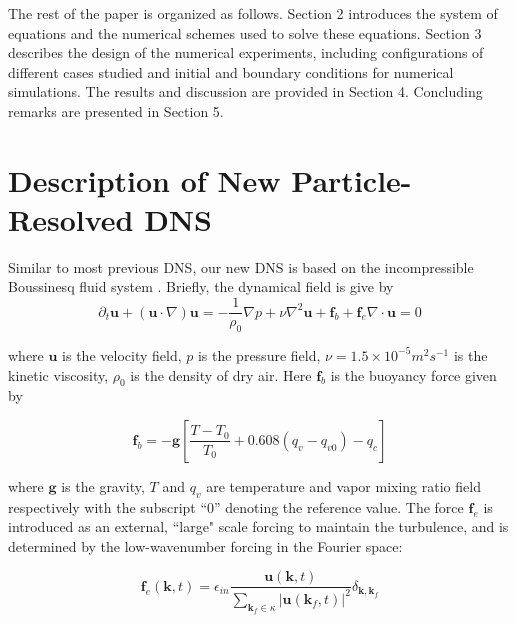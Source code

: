 The rest of the paper is organized as follows. Section 2 introduces the system of equations and the numerical schemes used to solve these equations. Section 3 describes the design of the numerical experiments, including configurations of different cases studied and initial and boundary conditions for numerical simulations. The results and discussion are provided in Section 4. Concluding remarks are presented in Section 5. 

\section{Description of New Particle-Resolved DNS}\label{particle_dns}

Similar to most previous DNS, our new DNS is based on the incompressible
Boussinesq fluid system \cite{And04}. Briefly, the dynamical field is give by
\begin{subequations}

\begin{equation}
\partial_{t}\mathbf{u}+(\mathbf{u}\cdot\nabla)\mathbf{u}=-\frac{1}{\rho_{0}}\nabla p+\nu\nabla^2 \mathbf{u}+\mathbf{f}_b + \mathbf{f}_e\label{eq:NS1}
\end{equation}


\begin{equation}
\nabla\cdot \mathbf{u}=0\label{eq:NS2}
\end{equation}

\end{subequations}

where $\mathbf{u}$ is the velocity field, $p$ is the pressure field, $\nu = 1.5\times 10^{-5}m^2s^{-1}$ is the kinetic viscosity, $\rho_{0}$ is the density of dry air. Here $\mathbf{f}_b$ is the buoyancy force given by 

\begin{equation}
\mathbf{f}_b= 
-\mathbf{g}[\frac{T-T_{0}}{T_0}+0.608(q_{v}-q_{v0})-q_{c}]
\label{eq:source_term}
\end{equation}

where $\mathbf{g}$ is the gravity, $T$ and $q_{v}$ are temperature
and vapor mixing ratio field respectively with the subscript ``$0$''
denoting the reference value. The force $\mathbf{f}_e$ is introduced as an 
external, ``large" scale forcing to maintain the turbulence, and is determined 
by the low-wavenumber forcing in the Fourier space:

\begin{equation}
\mathbf{f}_e(\mathbf{k},t) = \epsilon_{in}\frac{\mathbf{u}(\mathbf{k},t)}
{\sum_{\mathbf{k}_f\in \kappa}|\mathbf{u}(\mathbf{k}_f,t)|^2}
\delta_{\mathbf{k},\mathbf{k}_f}
\end{equation}

